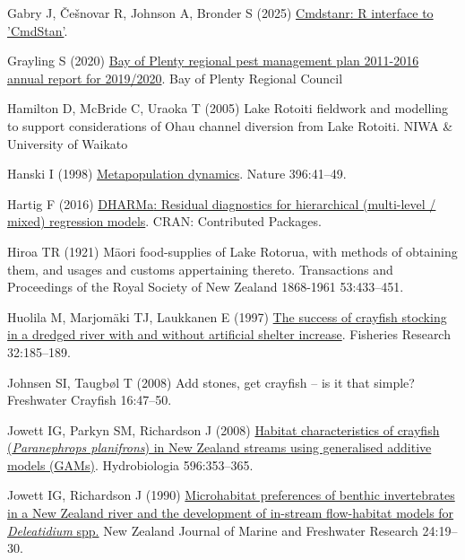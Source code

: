 \documentclass[
  letterpaper,
  DIV=11,
  numbers=noendperiod]{scrartcl}
\newlength{\cslhangindent}
\newenvironment{CSLReferences}[2] %
 {\begin{list}{}{%
  \setlength{\itemindent}{0pt}
  \setlength{\leftmargin}{0pt}
  \setlength{\parsep}{0pt}
  \ifodd #1
   \setlength{\leftmargin}{\cslhangindent}
   \setlength{\itemindent}{-1\cslhangindent}
  \fi
  \setlength{\itemsep}{#2\baselineskip}}}
 {\end{list}}
\begin{document}
\begin{CSLReferences}{1}{1}
Gabry J, Češnovar R, Johnson A, Bronder S (2025)
\href{https://mc-stan.org/cmdstanr/}{Cmdstanr: R interface to
'CmdStan'}.

Grayling S (2020)
\href{https://atlas.boprc.govt.nz/api/v1/edms/document/A3651696/content}{{Bay
of Plenty} regional pest management plan 2011-2016 annual report for
2019/2020}. Bay of Plenty Regional Council

Hamilton D, McBride C, Uraoka T (2005) {Lake Rotoiti} fieldwork and
modelling to support considerations of {Ohau} channel diversion from
{Lake Rotoiti}. NIWA \& University of Waikato

Hanski I (1998) \href{https://doi.org/10.1038/23876}{Metapopulation
dynamics}. Nature 396:41--49.

Hartig F (2016)
\href{https://doi.org/10.32614/cran.package.dharma}{{DHARMa}: Residual
diagnostics for hierarchical (multi-level / mixed) regression models}.
CRAN: Contributed Packages.

Hiroa TR (1921) M{ā}ori food-supplies of {Lake Rotorua}, with methods of
obtaining them, and usages and customs appertaining thereto.
Transactions and Proceedings of the Royal Society of New Zealand
1868-1961 53:433--451.

Huolila M, Marjomäki TJ, Laukkanen E (1997)
\href{https://doi.org/10.1016/s0165-7836(97)00046-5}{The success of
crayfish stocking in a dredged river with and without artificial shelter
increase}. Fisheries Research 32:185--189.

Johnsen SI, Taugbøl T (2008) Add stones, get crayfish -- is it that
simple? Freshwater Crayfish 16:47--50.

Jowett IG, Parkyn SM, Richardson J (2008)
\href{https://doi.org/10.1007/s10750-007-9108-z}{Habitat characteristics
of crayfish ({\emph{Paranephrops planifrons}}) in {New Zealand} streams
using generalised additive models ({GAMs})}. Hydrobiologia 596:353--365.

Jowett IG, Richardson J (1990)
\href{https://doi.org/10.1080/00288330.1990.9516399}{Microhabitat
preferences of benthic invertebrates in a {New Zealand} river and the
development of in-stream flow-habitat models for {\emph{Deleatidium}}
spp.} New Zealand Journal of Marine and Freshwater Research 24:19--30.


\end{CSLReferences}
\end{document}
